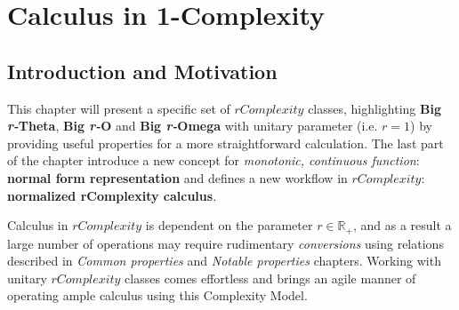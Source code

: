 \chapter{Calculus in 1-Complexity}


\section{Introduction and Motivation}
This chapter will present a specific set of $rComplexity$ classes, highlighting \textbf{Big \textit{r-}Theta}, \textbf{Big \textit{r-}O} and \textbf{Big \textit{r-}Omega} with unitary parameter (i.e. $r = 1$) by providing useful properties for a more straightforward calculation. The last part of the chapter introduce a new concept for \textit{monotonic, continuous function}: \textbf{normal form representation} and defines a new workflow in $rComplexity$: \textbf{normalized rComplexity calculus}.

Calculus in $rComplexity$ is dependent on the parameter $r \in \mathbb{R}_{+}$, and as a result a large number of operations may require rudimentary \textit{conversions} using relations described in \textit{Common properties} and \textit{Notable properties} chapters. Working with unitary $rComplexity$ classes comes effortless and brings an agile manner of operating ample
calculus using this Complexity Model.


